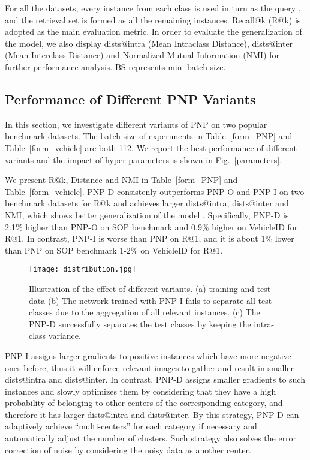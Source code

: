 For all the datasets, every instance from each class is used in turn as the query , and the retrieval set  is formed as all the remaining instances. Recall@k (R@k) is adopted  as the main evaluation metric. In order to evaluate the generalization of the model, we also display dists@intra (Mean Intraclass Distance), dists@inter (Mean Interclass Distance) \cite{roth2020revisiting} and Normalized Mutual Information (NMI) \cite{schutze2008introduction} for further performance analysis.  BS represents mini-batch size.


\subsection{Performance of Different PNP Variants}

\noindent In this section, we investigate different variants of PNP on two popular benchmark datasets. The batch size of experiments in Table~\ref{form_PNP} and Table~\ref{form_vehicle} are both 112. We report the best performance of different variants and the impact of hyper-parameters is shown in Fig.~\ref{parameters}. 

We present R@k, Distance and NMI in Table~\ref{form_PNP} and Table~\ref{form_vehicle}. PNP-D consistenly outperforms PNP-O and PNP-I on two benchmark datasets for R@k and achieves larger dists@intra, dists@inter and NMI, which shows better generalization of the model \cite{roth2020revisiting}. Specifically, PNP-D is 2.1\% higher than PNP-O on SOP benchmark and 0.9\% higher on VehicleID for R@1. In contrast, PNP-I is worse than PNP on R@1, and it is about 1\% lower than PNP on SOP benchmark 1-2\% on VehicleID for R@1. 

\begin{figure}[t]

\centering

\texttt{[image: distribution.jpg]}

\caption {Illustration of the effect of different variants. (a) training and test data (b) The network trained with PNP-I fails to separate all test classes due to the aggregation of all relevant instances. (c) The PNP-D successfully separates the test classes by keeping the intra-class variance.}
\label{toy_distribute}

\end{figure}


PNP-I assigns larger gradients to positive instances which have more negative ones before, thus it will enforce relevant images to gather and result in smaller dists@intra and dists@inter. In contrast, PNP-D assigns smaller gradients to such instances and slowly optimizes them by considering that they have a high probability of belonging to other centers of the corresponding category, and therefore it has larger dists@intra and dists@inter. By this strategy, PNP-D can adaptively achieve “multi-centers” for each category if necessary and automatically adjust the number of clusters. Such strategy also solves the error correction of noise by considering the noisy data as another center.


